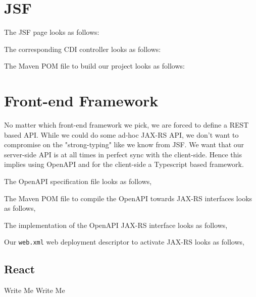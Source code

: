 \section{JSF}
The JSF page looks as follows:

The corresponding CDI controller looks as follows:

The Maven POM file to build our project looks as follows:


\section{Front-end Framework}
No matter which front-end framework we pick, we are forced to define a REST based API.
While we could do some ad-hoc JAX-RS API, we don't want to compromise on the "strong-typing" like we know from JSF.
We want that our server-side API is at all times in perfect sync with the client-side.
Hence this implies using OpenAPI and for the client-side a Typescript based framework.

The OpenAPI specification file looks as follows,


The Maven POM file to compile the OpenAPI towards JAX-RS interfaces looks as follows,


The implementation of the OpenAPI JAX-RS interface looks as follows,


Our \texttt{web.xml} web deployment descriptor to activate JAX-RS looks as follows,


\subsection{React}

\begin{TODO}{Write Me}
	Write Me
\end{TODO}